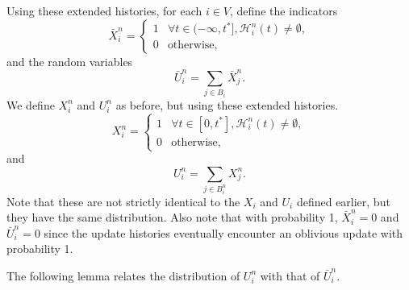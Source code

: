 
	Using these extended histories, for each $i \in V$, define the indicators
	\begin{equation}
		\bar{X}_i^n = \begin{cases}
			1 & \forall t \in (-\infty, t^*], \mathcal{H}_i^n(t) \neq \emptyset,\\
			0 & \text{otherwise},
		\end{cases}
	\end{equation}
	and the random variables
	\begin{equation}
		\bar{U}_i^n = \sum_{j \in B_i} \bar{X}_j^n.
	\end{equation}
	We define $X_i^n$ and $U_i^n$ as before, but using these extended histories.
	\begin{equation}
		X_i^n = \begin{cases}
			1 & \forall t \in [0, t^*], \mathcal{H}_i^n(t) \neq \emptyset,\\
			0 & \text{otherwise},
		\end{cases}
	\end{equation}
	and
	\begin{equation}
		U_i^n = \sum_{j \in B_i^n} X_j^n.
	\end{equation}
	Note that these are not strictly identical to the $X_i$ and $U_i$ defined earlier, but they have the same distribution. Also note that with probability 1, $\bar{X}_i^n = 0$ and $\bar{U}_i^n = 0$ since the update histories eventually encounter an oblivious update with probability 1.

	The following lemma relates the distribution of $U_i^n$ with that of $\bar{U}_i^n$.

